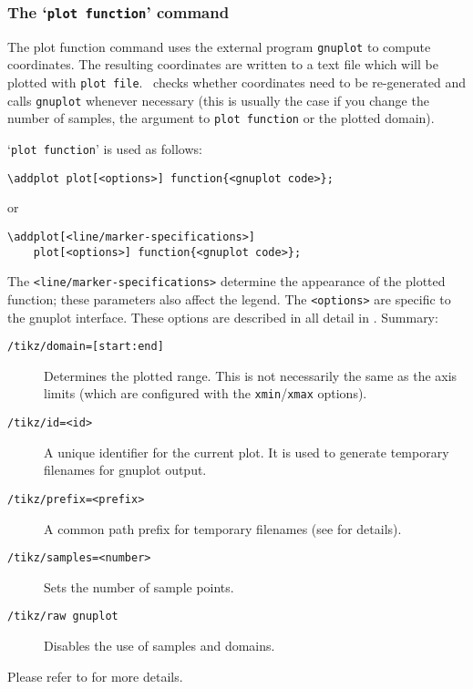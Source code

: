 \subsubsection{The `\texttt{plot function}' command}
The plot function command uses the external program \texttt{gnuplot} to compute coordinates. The resulting coordinates are written to a text file which will be plotted with \texttt{plot file}. \PGF\ checks whether coordinates need to be re-generated and calls \texttt{gnuplot} whenever necessary (this is usually the case if you change the number of samples, the argument to \texttt{plot function} or the plotted domain).

`\texttt{plot function}' is used as follows:
\begin{lstlisting}
\addplot plot[<options>] function{<gnuplot code>};
\end{lstlisting}
or
\begin{lstlisting}
\addplot[<line/marker-specifications>] 
	plot[<options>] function{<gnuplot code>};
\end{lstlisting}
The \lstinline!<line/marker-specifications>! determine the appearance of the plotted function; these parameters also affect the legend. The \lstinline!<options>! are specific to the gnuplot interface. These options are described in all detail in \cite[section~18.6]{tikz}. Summary:
\begin{description}
\item[\texttt{/tikz/domain=[start:end]}] Determines the plotted range. This is not necessarily the same as the axis limits (which are configured with the \texttt{xmin}/\texttt{xmax} options). 
\item[\texttt{/tikz/id=<id>}] A unique identifier for the current plot. It is used to generate temporary filenames for gnuplot output.
\item[\texttt{/tikz/prefix=<prefix>}] A common path prefix for temporary filenames (see \cite[section~18.6]{tikz} for details).
\item[\texttt{/tikz/samples=<number>}] Sets the number of sample points.
\item[\texttt{/tikz/raw gnuplot}] Disables the use of samples and domains.
\end{description}
Please refer to \cite[section~18.6]{tikz} for more details.

